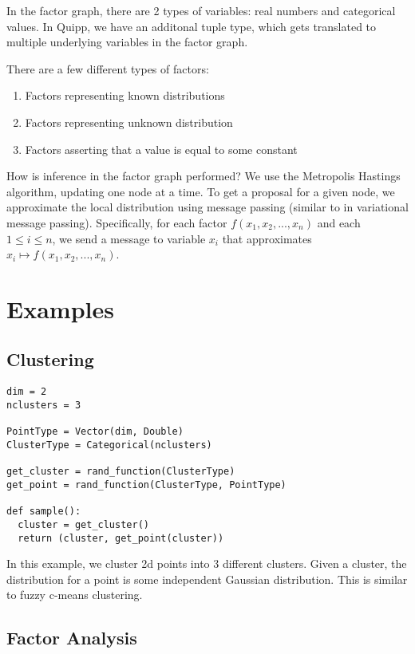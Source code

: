 \documentclass[proceed]{article}
\begin{document}
    In the factor graph, there are 2 types of variables: real numbers
    and categorical values.
    In Quipp, we have an additonal tuple type, which gets translated
    to multiple underlying variables in the factor graph.

    There are a few different types of factors:
    \begin{enumerate}
      \item Factors representing known distributions
      \item Factors representing unknown distribution
      \item Factors asserting that a value is equal to some constant
    \end{enumerate}

    How is inference in the factor graph performed?  We use the Metropolis Hastings
    algorithm, updating one node at a time.  To get a proposal for a given node,
    we approximate the local distribution using message passing (similar to
    in variational message passing).  Specifically, for each factor
    $f(x_1, x_2, ..., x_n)$ and each $1 \leq i \leq n$, we send a message
    to variable $x_i$ that approximates $x_i \mapsto f(x_1, x_2, ..., x_n)$.



  \section{Examples}

  \subsection{Clustering}
\begin{verbatim}
dim = 2
nclusters = 3

PointType = Vector(dim, Double)
ClusterType = Categorical(nclusters)

get_cluster = rand_function(ClusterType)
get_point = rand_function(ClusterType, PointType)

def sample():
  cluster = get_cluster()
  return (cluster, get_point(cluster))
\end{verbatim}

In this example, we cluster 2d points into 3 different clusters.  Given a cluster, the distribution for a point is some independent Gaussian distribution.  This is similar to fuzzy c-means clustering.


  \subsection{Factor Analysis}
\end{document}
